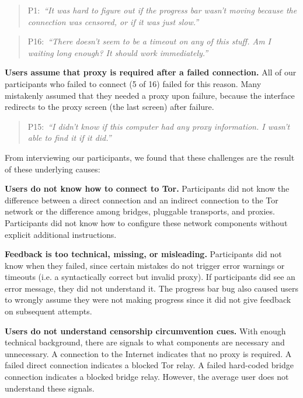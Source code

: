 \documentclass[USenglish,oneside,twocolumn]{article}
\newcommand{\pquote}[2]{
\begin{quotation}
\noindent #1:~\textit{``#2''}
\end{quotation}
}
\begin{document}
{\begin{description}
\smallskip
\pquote{P1}{It was hard to figure out if the progress bar wasn't moving because the connection was censored, or if it was just slow.}
\smallskip
\pquote{P16}{There doesn't seem to be a timeout on any of this stuff. Am I waiting long enough? It should work immediately.}
\smallskip

\item {\bfseries Users assume that proxy is required after a failed connection.}
All of our participants who failed to connect (5 of 16) failed for this reason. Many mistakenly assumed that they needed a proxy upon failure, because the interface redirects to the proxy screen (the last screen) after failure. 

\smallskip
\pquote{P15}{I didn't know if this computer had any proxy information. I wasn't able to find it if it did.}
\end{description}

From interviewing our participants, we found that these challenges are the result of these underlying causes: \\

\begin{description}
\item {\bfseries Users do not know how to connect to Tor.} Participants did not know the difference between a direct connection and an indirect connection to the Tor network or the difference among bridges, pluggable transports, and proxies. Participants did not know how to configure these network components without explicit additional instructions. 
\item {\bfseries Feedback is too technical, missing, or misleading.} Participants did not know when they failed, since certain mistakes do not trigger error warnings or timeouts (i.e. a syntactically correct but invalid proxy). If participants did see an error message, they did not understand it. The progress bar bug also caused users to wrongly assume they were not making progress since it did not give feedback on subsequent attempts. 
\item {\bfseries Users do not understand censorship circumvention cues.} With enough technical background, there are  signals to what components are necessary and unnecessary. A connection to the Internet indicates that no proxy is required. A failed direct connection indicates a blocked Tor relay. A failed hard-coded bridge connection indicates a blocked bridge relay. However, the average user does not understand these signals.
\end{description} 

}
\end{document}
